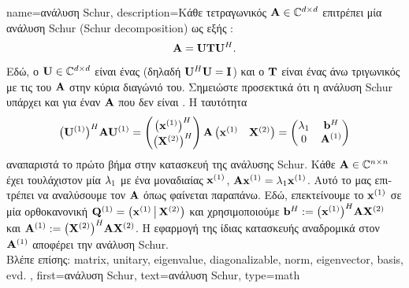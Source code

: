 {name={\foreignlanguage{greek}{ανάλυση} Schur},
	description={\foreignlanguage{greek}{Κάθε τετραγωνικός}  ${\bf A} \in \mathbb{C}^{d \times d}$ 
		\foreignlanguage{greek}{επιτρέπει μία ανάλυση} Schur (Schur decomposition) 
		\foreignlanguage{greek}{ως εξής} \cite[\foreignlanguage{greek}{Θεώρημα} 7.1.3]{GolubVanLoanBook}:
		\[
		{\bf A} = \mathbf{U} \mathbf{T} \mathbf{U}^{H}. 
		\]
		\foreignlanguage{greek}{Εδώ, ο $\mathbf{U} \in \mathbb{C}^{d \times d}$ είναι ένας}  
		(\foreignlanguage{greek}{δηλαδή $\mathbf{U}^{H}\mathbf{U} = \mathbf{I}$) και ο $\mathbf{T}$ είναι ένας άνω τριγωνικός με τις}  
		\foreignlanguage{greek}{του ${\bf A}$ στην κύρια διαγώνιό του. Σημειώστε προσεκτικά ότι η ανάλυση} Schur 
		\foreignlanguage{greek}{υπάρχει και για έναν}  ${\bf A}$ \foreignlanguage{greek}{που δεν είναι} 
		. \foreignlanguage{greek}{Η ταυτότητα}
		\[
			\big(\mathbf{U}^{(1)}\big)^{H} {\bf A} \mathbf{U}^{(1)}
			=
			\begin{pmatrix}
			\big({\bf x}^{(1)}\big)^{H} \\
			\big({\bf X}^{(2)}\big)^{H}
			\end{pmatrix}
			{\bf A}
			\begin{pmatrix}
			{\bf x}^{(1)} & {\bf X}^{(2)}
			\end{pmatrix}
			=
			\begin{pmatrix}
			\lambda_{1} & {\bf b}^{H} \\
			0 & {\bf A}^{(1)}
			\end{pmatrix}
		\]
		\foreignlanguage{greek}{αναπαριστά το πρώτο βήμα στην κατασκευή της ανάλυσης} Schur. \foreignlanguage{greek}{Κάθε}
		 ${\bf A} \in \mathbb{C}^{n\times n}$ \foreignlanguage{greek}{έχει τουλάχιστον μία}  $\lambda_{1}$ 
		\foreignlanguage{greek}{με ένα μοναδιαίας}   ${\bf x}^{(1)}$, ${\bf A} {\bf x}^{(1)} = \lambda_{1} {\bf x}^{(1)}$. 
		\foreignlanguage{greek}{Αυτό το}  \foreignlanguage{greek}{μας επιτρέπει να αναλύσουμε τον ${\bf A}$ όπως 
		φαίνεται παραπάνω. Εδώ, επεκτείνουμε το ${\bf x}^{(1)}$ σε μία ορθοκανονική}  
		$\mathbf{Q}^{(1)} = \big( {\bf x}^{(1)} \,\big|\, {\bf X}^{(2)} \big)$ \foreignlanguage{greek}{και χρησιμοποι\-ού\-με ${\bf b}^{H} := \big({\bf x}^{(1)}\big)^{H} {\bf A} {\bf X}^{(2)}$ 
		και ${\bf A}^{(1)} := \big({\bf X}^{(2)}\big)^{H} {\bf A} {\bf X}^{(2)}$. Η εφαρμογή της ίδιας κατασκευής αναδρομικά στον ${\bf A}^{(1)}$ 
		αποφέρει την ανάλυση} Schur.
		\\
 		\foreignlanguage{greek}{Βλέπε επίσης:} \gls{matrix}, \gls{unitary},  \gls{eigenvalue}, \gls{diagonalizable}, \gls{norm}, \gls{eigenvector}, 
		\gls{basis}, \gls{evd}. },
	first={\foreignlanguage{greek}{ανάλυση} Schur},
	text={\foreignlanguage{greek}{ανάλυση} Schur},
	type=math
}


